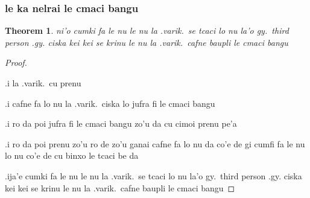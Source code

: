 \documentclass{article}
\newtheorem{thm}{Theorem}
\begin{document}
\subsubsection{le ka nelrai le cmaci bangu}
\begin{thm}
	ni'o cumki fa le nu le nu la .varik.\ se tcaci lo nu la'o gy.\ third person .gy. ciska kei kei se krinu le nu la .varik.\ cafne baupli le cmaci bangu
\end{thm}
\begin{proof}
	${ }$

	.i la .varik.\ cu prenu

	.i cafne fa lo nu la .varik.\ ciska lo jufra fi le cmaci bangu

	.i ro da poi jufra fi le cmaci bangu zo'u da cu cimoi prenu pe'a

	.i ro da poi prenu zo'u ro de zo'u ganai cafne fa lo nu da co'e de gi cumfi fa le nu lo nu co'e de cu binxo le tcaci be da

	.ija'e cumki fa le nu le nu la .varik.\ se tcaci lo nu la'o gy.\ third person .gy. ciska kei kei se krinu le nu la .varik.\ cafne baupli le cmaci bangu
\end{proof}
\end{document}
